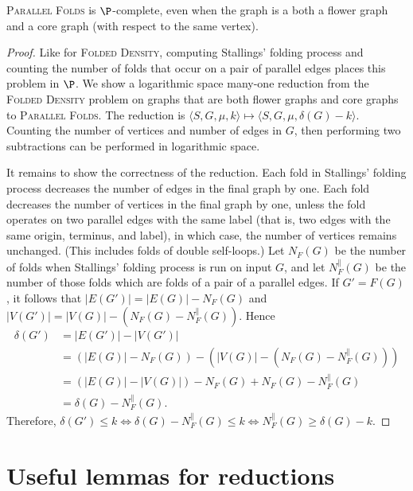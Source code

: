 \documentclass{article}
\newcommand{\FD}{\textsc{Folded Density}}
\newcommand{\PFolds}{\textsc{Parallel Folds}}
\begin{document}
\begin{theorem}
  \PFolds{} is $\P$-complete, even when the graph is a both a flower graph and a core graph (with respect to the same vertex).
\end{theorem}
\begin{proof}
  Like for \FD, computing Stallings' folding process and counting the number of folds that occur on a pair of parallel edges places this problem in $\P$.
  We show a logarithmic space many-one reduction from the \FD{} problem on graphs that are both flower graphs and core graphs to \PFolds{}.
  The reduction is $\langle S, G, \mu, k \rangle \mapsto \langle S, G, \mu, \delta(G) - k \rangle$.
  Counting the number of vertices and number of edges in $G$, then performing two subtractions can be performed in logarithmic space.

  It remains to show the correctness of the reduction.
  Each fold in Stallings' folding process decreases the number of edges in the final graph by one.
  Each fold decreases the number of vertices in the final graph by one, unless the fold operates on two parallel edges with the same label (that is, two edges with the same origin, terminus, and label), in which case, the number of vertices remains unchanged.
  (This includes folds of double self-loops.)
  Let $N_F(G)$ be the number of folds when Stallings' folding process is run on input $G$, and let $N^\|_F(G)$ be the number of those folds which are folds of a pair of a parallel edges.
  If $G' = F(G)$, it follows that $|E(G')| = |E(G)| - N_F(G)$ and $|V(G')| = |V(G)| - (N_F(G) - N^\|_F(G))$.
  Hence
  \begin{align*}
    \delta(G') & = |E(G')| - |V(G')| \\
    & = (|E(G)| - N_F(G)) - (|V(G)| - (N_F(G) - N^\|_F(G))) \\
    & = (|E(G)| - |V(G)|) - N_F(G) + N_F(G) - N^\|_F(G) \\
    & = \delta(G) - N^\|_F(G).
  \end{align*}
  Therefore, $\delta(G') \leq k \iff \delta(G) - N^\|_F(G) \leq k \iff N^\|_F(G) \geq \delta(G) - k$.
\end{proof}

\section{Useful lemmas for reductions}

\end{document}
